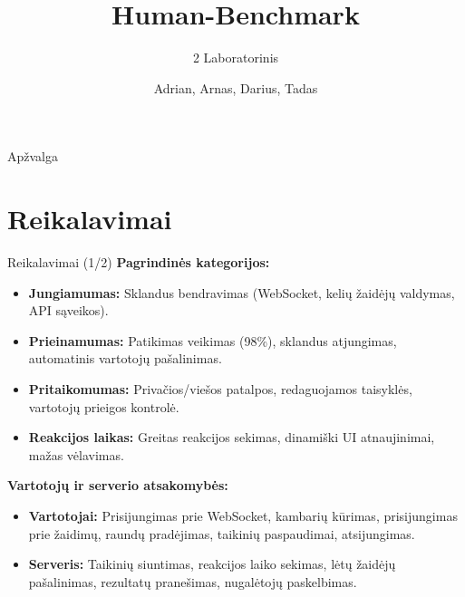 \documentclass[aspectratio=169,xcolor=dvipsnames]{beamer}
\title{Human-Benchmark}
\subtitle{2 Laboratorinis}
\author{Adrian, Arnas, Darius, Tadas}
\institute
{
    Matematikos ir informatikos fakultetas \\
    Vilniaus universitetas %
}
\begin{document}
\begin{frame}
    \titlepage
\end{frame}

\begin{frame}{Apžvalga}
    \tableofcontents
\end{frame}

\section{Reikalavimai}

\begin{frame}{Reikalavimai (1/2)}
    \textbf{Pagrindinės kategorijos:}
    \begin{itemize}
        \item \textbf{Jungiamumas:} Sklandus bendravimas (WebSocket, kelių žaidėjų valdymas, API sąveikos).
        \item \textbf{Prieinamumas:} Patikimas veikimas (98\%), sklandus atjungimas, automatinis vartotojų pašalinimas.
        \item \textbf{Pritaikomumas:} Privačios/viešos patalpos, redaguojamos taisyklės, vartotojų prieigos kontrolė.
        \item \textbf{Reakcijos laikas:} Greitas reakcijos sekimas, dinamiški UI atnaujinimai, mažas vėlavimas.
    \end{itemize}
    
    \textbf{Vartotojų ir serverio atsakomybės:}
    \begin{itemize}
        \item \textbf{Vartotojai:} Prisijungimas prie WebSocket, kambarių kūrimas, prisijungimas prie žaidimų, raundų pradėjimas, taikinių paspaudimai, atsijungimas.
        \item \textbf{Serveris:} Taikinių siuntimas, reakcijos laiko sekimas, lėtų žaidėjų pašalinimas, rezultatų pranešimas, nugalėtojų paskelbimas.
    \end{itemize}
    \end{frame}
    
\end{document}
